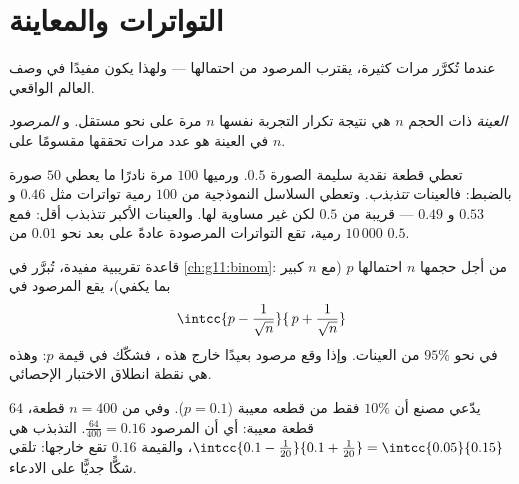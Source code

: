 \section{التواترات والمعاينة}

عندما تُكرَّر  مرات كثيرة، يقترب  المرصود
 من احتمالها --- ولهذا يكون 
مفيدًا في وصف العالم الواقعي.

\begin{definition}[العينة]\label{def:g10:proba:sample}
\emph{العينة} ذات الحجم $n$ هي نتيجة تكرار
التجربة نفسها $n$ مرة على نحو مستقل. و\emph{ المرصود} 
في العينة هو عدد مرات تحققها مقسومًا على $n$.
\end{definition}

\begin{example}\label{ex:g10:proba:sampling}
تعطي قطعة نقدية سليمة الصورة  $0.5$. ورميها $100$ مرة
نادرًا ما يعطي $50$ صورة بالضبط: فالعينات \emph{تتذبذب}. وتعطي السلاسل
النموذجية من $100$ رمية تواترات مثل $0.46$ و $0.53$ و $0.49$ --- قريبة من
$0.5$ لكن غير مساوية لها. والعينات الأكبر تتذبذب أقل: فمع $10\,000$
رمية، تقع التواترات المرصودة عادةً على بعد نحو $0.01$ من $0.5$.
\end{example}

\begin{remark}
قاعدة تقريبية مفيدة، تُبرَّر في \cref{ch:g11:binom}: من أجل 
حجمها $n$  احتمالها $p$ (مع $n$ كبير بما يكفي)، يقع
 المرصود في 
\[
\intcc{p - \frac{1}{\sqrt n}}{\,p + \frac{1}{\sqrt n}}
\]
في نحو $95\%$ من العينات. وإذا وقع  مرصود بعيدًا خارج
هذه ، فشكّك في قيمة $p$: وهذه هي نقطة انطلاق
الاختبار الإحصائي.
\end{remark}

\begin{example}\label{ex:g10:proba:test}
يدّعي مصنع أن $10\%$ فقط من قطعه معيبة
($p = 0.1$). وفي  من $n = 400$ قطعة، $64$ قطعة معيبة: أي أن 
المرصود $\frac{64}{400} = 0.16$.  التذبذب هي
$\intcc{0.1 - \frac{1}{20}}{0.1 + \frac{1}{20}} = \intcc{0.05}{0.15}$،
والقيمة $0.16$ تقع خارجها:  تلقي شكًّا جديًّا على الادعاء.
\end{example}

